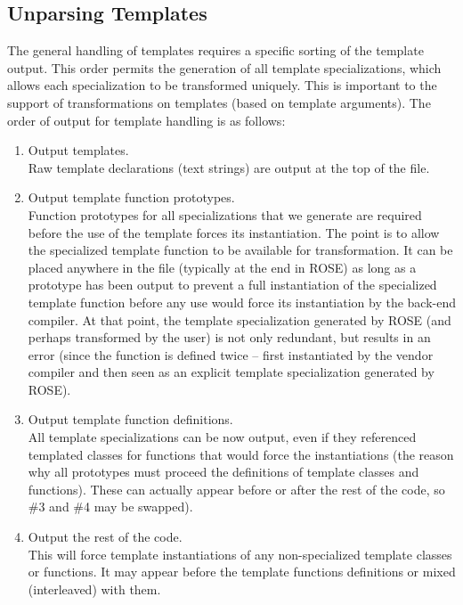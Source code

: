\subsection{ Unparsing Templates }
   The general handling of templates requires a specific sorting of the template output.
This order permits the generation of all template specializations, which allows 
each specialization to be transformed uniquely.  This is important
to the support of transformations on templates (based on template arguments).
The order of output for template handling is as follows:
\begin{enumerate}
     \item Output templates. \\
           Raw template declarations (text strings) are output at the top of the file.

     \item Output template function prototypes. \\
           Function prototypes for all specializations that we generate are required
           before the use of the template forces its instantiation.  The point is to 
           allow the specialized template function to be available for transformation.
           It can be placed anywhere in the file (typically at the end in ROSE) as long
           as a prototype has been output to prevent a full instantiation of the
           specialized template function before any use would force its instantiation by
           the back-end compiler. At that point, the template specialization generated by 
           ROSE (and perhaps transformed by the user) is not only redundant, but results 
           in an error (since the function is defined twice -- first instantiated by the 
           vendor compiler and then seen as an explicit template specialization 
           generated by ROSE).

     \item Output template function definitions. \\
           All template specializations can be now output, even if they referenced 
           templated classes for functions that would force the instantiations (the 
           reason why all prototypes must proceed the definitions of template classes 
           and functions).  These can actually appear before or after the rest of the 
           code, so \#3 and \#4 may be swapped).

     \item Output the rest of the code. \\
           This will force template instantiations of any non-specialized template classes
           or functions.  It may appear before the template functions definitions or mixed
           (interleaved) with them.


\end{enumerate}
